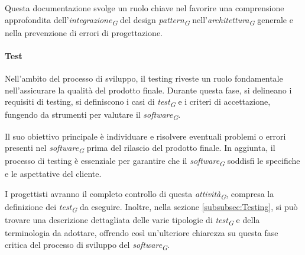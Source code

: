 \vspace{0.2cm}

Questa documentazione svolge un ruolo chiave nel favorire una comprensione approfondita dell'\textit{integrazione}\textsubscript{\textit{G}} del design \textit{pattern}\textsubscript{\textit{G}} nell'\textit{architettura}\textsubscript{\textit{G}} generale e nella prevenzione di errori di progettazione.

\paragraph{Test}
Nell'ambito del processo di sviluppo, il testing riveste un ruolo fondamentale nell'assicurare la qualità del prodotto finale. Durante questa fase, si delineano i requisiti di testing, si definiscono i casi di \textit{test}\textsubscript{\textit{G}} e i criteri di accettazione, fungendo da strumenti per valutare il \textit{software}\textsubscript{\textit{G}}.

\vspace{0.2cm}

Il suo obiettivo principale è individuare e risolvere eventuali problemi o errori presenti nel \textit{software}\textsubscript{\textit{G}} prima del rilascio del prodotto finale. In aggiunta, il processo di testing è essenziale per garantire che il \textit{software}\textsubscript{\textit{G}} soddisfi le specifiche e le aspettative del cliente.

\vspace{0.2cm}

I progettisti avranno il completo controllo di questa \textit{attività}\textsubscript{\textit{G}}, compresa la definizione dei \textit{test}\textsubscript{\textit{G}} da eseguire. Inoltre, nella sezione \ref{subsubsec:Testing}, si può trovare una descrizione dettagliata delle varie tipologie di \textit{test}\textsubscript{\textit{G}} e della terminologia da adottare, offrendo così un'ulteriore chiarezza su questa fase critica del processo di sviluppo del \textit{software}\textsubscript{\textit{G}}.

